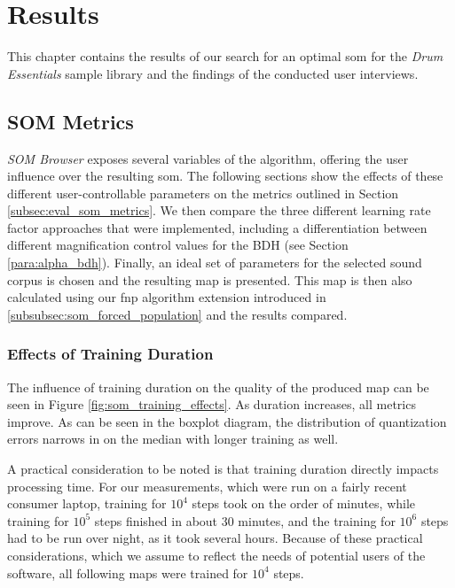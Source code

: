 
\section{Results}
\label{sec:results}
This chapter contains the results of our search for an optimal \gls{som} for the
\textit{Drum Essentials} sample library and the findings of the conducted user
interviews.

\subsection{SOM Metrics}
\label{subsec:results_som_metrics}
\textit{SOM Browser} exposes several variables of the algorithm, offering the
user influence over the resulting \gls{som}. The following sections show the
effects of these different user-controllable parameters on the metrics outlined
in Section \ref{subsec:eval_som_metrics}.
We then compare the three different learning rate factor approaches that were
implemented, including a differentiation between different magnification control
values for the BDH (see Section \ref{para:alpha_bdh}).
Finally, an ideal set of parameters for the selected sound corpus is chosen and
the resulting map is presented.
This map is then also calculated using our \gls{fnp} algorithm
extension introduced in \ref{subsubsec:som_forced_population} and the results
compared.

\subsubsection{Effects of Training Duration}
\label{subsubsec:som_training_effects}
The influence of training duration on the quality of the produced map can be
seen in Figure \ref{fig:som_training_effects}. As duration increases, all
metrics improve. As can be seen in the boxplot diagram, the distribution of
quantization errors narrows in on the median with longer training as well.

\smallskip

A practical consideration to be noted is that training duration
directly impacts processing time. For our measurements, which were run on a
fairly recent consumer laptop, training for $10^4$ steps took on the order of
minutes, while training for $10^5$ steps finished in about 30 minutes, and
the training for $10^6$ steps had to be run over night, as it took several
hours. Because of these practical considerations, which we assume to reflect
the needs of potential users of the software, all following maps were trained
for $10^4$ steps.

